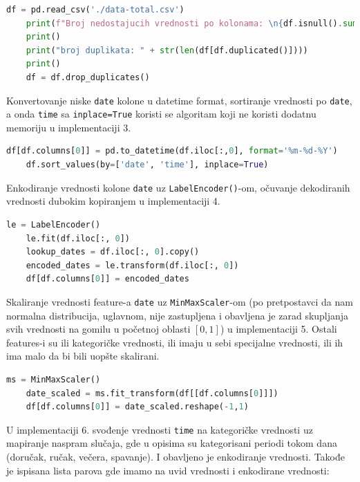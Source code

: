 \documentclass[fontsize=12bp, paper=a4]{scrarticle}
\begin{document}
\begin{lstlisting}[language=Python, caption={\centering Učitavanje podataka, prebrojavanje nedostajaćih vrednosti po koloni, prebrojavanje i eliminisanje duplikata}]
    df = pd.read_csv('./data-total.csv')
    print(f"Broj nedostajucih vrednosti po kolonama: \n{df.isnull().sum()}")
    print()
    print("broj duplikata: " + str(len(df[df.duplicated()])))
    print()
    df = df.drop_duplicates()
\end{lstlisting}

Konvertovanje niske \texttt{date} kolone u datetime format, sortiranje vrednosti po \texttt{date}, a onda \texttt{time} sa \verb|inplace=True| koristi se algoritam koji ne koristi dodatnu memoriju u implementaciji 3.
    
\begin{lstlisting}[language=Python, caption={\centering Konvertovanje niske \texttt{date} kolone u datetime format, sortiranje vrednosti po \texttt{date}, a onda \texttt{time}}]
    df[df.columns[0]] = pd.to_datetime(df.iloc[:,0], format='%m-%d-%Y')
    df.sort_values(by=['date', 'time'], inplace=True)
\end{lstlisting}

Enkodiranje vrednosti kolone \texttt{date} uz \verb|LabelEncoder()|-om, očuvanje dekodiranih vrednosti dubokim kopiranjem u implementaciji 4.

\begin{lstlisting}[language=Python, caption={\centering Enkodiranje vrednosti kolone \texttt{date}, očuvanje dekodiranih vrednosti dubokim kopiranjem}]
    le = LabelEncoder()
    le.fit(df.iloc[:, 0])
    lookup_dates = df.iloc[:, 0].copy()
    encoded_dates = le.transform(df.iloc[:, 0])
    df[df.columns[0]] = encoded_dates
\end{lstlisting}
Skaliranje vrednosti feature-a \verb|date| uz \verb|MinMaxScaler|-om (po pretpostavci da nam normalna distribucija, uglavnom, nije zastupljena i obavljena je zarad skupljanja svih vrednosti na gomilu u početnoj oblasti $[0,1]$) u implementaciji 5. Ostali features-i su ili kategoričke vrednosti, ili imaju u sebi specijalne vrednosti, ili ih ima malo da bi bili uopšte skalirani.
\begin{lstlisting}[language=Python, caption={\centering MinMaxScaler}]
    ms = MinMaxScaler()
    date_scaled = ms.fit_transform(df[[df.columns[0]]])
    df[df.columns[0]] = date_scaled.reshape(-1,1)
\end{lstlisting}

U implementaciji 6. svođenje vrednosti \verb|time| na kategoričke vrednosti uz mapiranje naspram slučaja, gde u opisima su kategorisani periodi tokom dana (doručak, ručak, večera, spavanje). I obavljeno je enkodiranje vrednosti. Takođe je ispisana lista parova gde imamo na uvid vrednosti i enkodirane vrednosti: 
\end{document}
